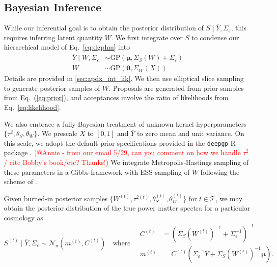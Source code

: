 \documentclass[11pt]{article}
\begin{document}
\subsection{Bayesian Inference}

While our inferential goal is to obtain the posterior distribution of 
$S\mid\bar{Y},\Sigma_\varepsilon$, this requires inferring latent quantity $W$.  
We first integrate over $S$ to condense our hierarchical model of Eq.~\ref{eq:dgphm} into
\begin{align}
\label{eq:likelihood}
\bar{Y} \mid W, \Sigma_\varepsilon &\sim \textrm{GP}(\boldsymbol{\mu}, \Sigma_S(W) + \Sigma_\varepsilon) \\
\label{eq:prior}
W &\sim \mathrm{GP}\left(\mathbf{0}, \Sigma_W(X)\right)
\end{align}
Details are provided in \ref{sec:apdx_int_lik}. We then use elliptical slice
sampling \citep[ESS;][]{murray2010elliptical} to generate posterior samples of $W$.  
Proposals are generated from prior samples from Eq.~(\ref{eq:prior}), and acceptances 
involve the ratio of likelihoods from Eq.~\ref{eq:likelihood}.

We also embrace a fully-Bayesian treatment of unknown kernel hyperparameters 
$\{\tau^2, \theta_S, \theta_W\}$.  We prescale $X$ to $[0, 1]$
and $\bar{Y}$ to zero mean and unit variance.  On this scale, we adopt the default 
prior specifications provided in the {\tt deepgp} {\sf R}-package \citep{deepgp}.
\textcolor{red}{(@Annie - from our email 5/29, can you comment on how we handle $\tau^2$/
cite Bobby's book/etc? Thanks!)}
We integrate Metropolis-Hastings sampling of these parameters in a Gibbs framework with ESS
sampling of $W$ following the scheme of \citep{sauer2023active}.

Given burned-in posterior samples $\{W^{(t)}, \tau^{2(t)}, \theta_S^{(t)}, \theta_W^{(t)}\}$
for $t\in\mathcal{T}$, we may obtain the
posterior distribution of the true power matter spectra for a particular cosmology as
\[
S^{(t)}\mid\bar{Y}, \Sigma_\varepsilon \sim \mathcal{N}_n(m^{(t)}, C^{(t)})
\quad\textrm{where}\quad
\begin{array}{rl}
C^{(t)}&=\left(\Sigma_S(W^{(t)})^{-1}+\Sigma_\varepsilon^{-1}\right)^{-1} \\
m^{(t)}&=C^{(t)}\left(\Sigma_\varepsilon^{-1}\bar{Y}+\Sigma_S(W^{(t)})^{-1}\boldsymbol{\mu}\right).
\end{array}
\] 
\end{document}
